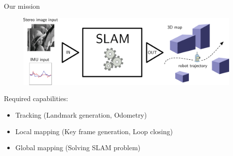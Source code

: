 \documentclass[11pt]{beamer}
\begin{document}
\begin{frame}{Our mission}
\begin{figure}[!htb]
\centering
\includegraphics[width=\textwidth]{figures/introduction/basic_concept.pdf}
\end{figure}
Required capabilities:
\begin{itemize}
\item Tracking (Landmark generation, Odometry)
\item Local mapping (Key frame generation, Loop closing)
\item Global mapping (Solving SLAM problem)
\end{itemize}
\end{frame}
\end{document}
